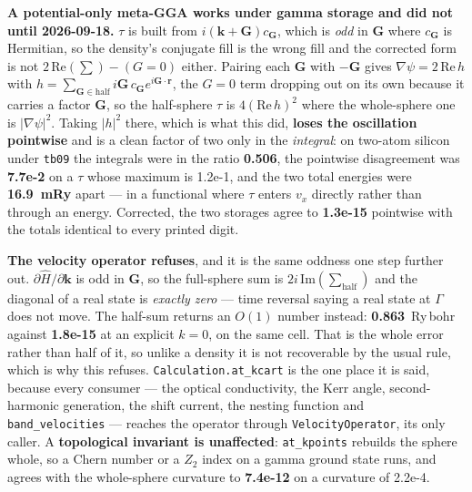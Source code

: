 \documentclass[11pt,a4paper]{article}
\newcommand{\code}[1]{\texttt{\small #1}}
\begin{document}
\begin{refuses}
\textbf{A potential-only meta-GGA works under gamma storage and did not until
2026-09-18.} $\tau$ is built from $i(\mathbf k+\mathbf G)c_{\mathbf G}$, which is
\emph{odd} in $\mathbf G$ where $c_{\mathbf G}$ is Hermitian, so the density's
conjugate fill is the wrong fill and the corrected form is not
$2\,\mathrm{Re}(\sum)-(G{=}0)$ either. Pairing each $\mathbf G$ with $-\mathbf G$
gives $\nabla\psi = 2\,\mathrm{Re}\,h$ with $h=\sum_{\mathbf G\in\mathrm{half}}
i\mathbf G\,c_{\mathbf G}e^{i\mathbf G\cdot\mathbf r}$, the $G=0$ term dropping out
on its own because it carries a factor $\mathbf G$, so the half-sphere $\tau$ is
$4(\mathrm{Re}\,h)^2$ where the whole-sphere one is $|\nabla\psi|^2$. Taking
$|h|^2$ there, which is what this did, \textbf{loses the oscillation pointwise}
and is a clean factor of two only in the \emph{integral}: on two-atom silicon
under \code{tb09} the integrals were in the ratio \textbf{0.506}, the pointwise
disagreement was \textbf{7.7e-2} on a $\tau$ whose maximum is 1.2e-1, and the two
total energies were \textbf{16.9~mRy} apart --- in a functional where $\tau$ enters
$v_x$ directly rather than through an energy. Corrected, the two storages agree to
\textbf{1.3e-15} pointwise with the totals identical to every printed digit.

\textbf{The velocity operator refuses}, and it is the same oddness one step
further out. $\partial\hat H/\partial\mathbf k$ is odd in $\mathbf G$, so the
full-sphere sum is $2i\,\mathrm{Im}(\sum_{\mathrm{half}})$ and the diagonal of a
real state is \emph{exactly zero} --- time reversal saying a real state at
$\Gamma$ does not move. The half-sum returns an $O(1)$ number instead:
\textbf{0.863}~Ry\,bohr against \textbf{1.8e-15} at an explicit $k=0$, on the same
cell. That is the whole error rather than half of it, so unlike a density it is
not recoverable by the usual rule, which is why this refuses.
\code{Calculation.at\_kcart} is the one place it is said, because every consumer
--- the optical conductivity, the Kerr angle, second-harmonic generation, the
shift current, the nesting function and \code{band\_velocities} --- reaches the
operator through \code{VelocityOperator}, its only caller. A \textbf{topological
invariant is unaffected}: \code{at\_kpoints} rebuilds the sphere whole, so a
Chern number or a $Z_2$ index on a gamma ground state runs, and agrees with the
whole-sphere curvature to \textbf{7.4e-12} on a curvature of 2.2e-4.


\end{refuses}
\end{document}
